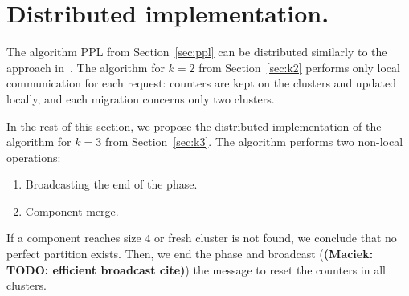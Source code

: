 \documentclass[manuscript,screen=true, review, anonymous]{acmart}
\DeclarePairedDelimiter\set{\{}{\}}
\newcommand\maciek[1]{\color{brown}\textbf{(Maciek: #1)}\color{black}}
\begin{document}

\section{Distributed implementation.}
The algorithm PPL from Section~\ref{sec:ppl} can be distributed
similarly to the approach in~\cite{sigmetrics19_partitioning}.
The algorithm for $k=2$ from Section~\ref{sec:k2} performs only local communication for each request: counters are kept on the clusters and updated locally, and each migration concerns only two clusters.
\medskip

In the rest of this section, we propose the distributed implementation of the algorithm for $k=3$ from Section~\ref{sec:k3}.
The algorithm performs two non-local operations:
\begin{enumerate}
	\item Broadcasting the end of the phase.\label{it:broadcast}
	\item Component merge.
	\label{it:merge}
\end{enumerate}

If a component reaches size $4$ or fresh cluster is not found, we conclude that no perfect partition exists.
Then, we end the phase and broadcast (\maciek{TODO: efficient broadcast cite}) the message to  reset the counters in all clusters.
\end{document}
